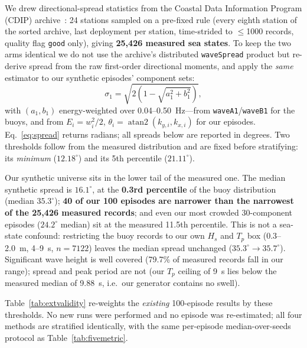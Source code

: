 We drew directional-spread statistics from the Coastal Data Information Program
(CDIP) archive~\citep{cdip, oreilly2016}: 24 stations sampled on a pre-fixed rule (every
eighth station of the sorted archive, last deployment per station, time-strided
to $\leq$1000 records, quality flag \texttt{good} only), giving
\textbf{25,426 measured sea states}.  To keep the two arms identical we do not
use the archive's distributed \texttt{waveSpread} product but re-derive spread
from the raw first-order directional moments, and apply the \emph{same}
estimator to our synthetic episodes' component sets:
\begin{equation}
  \sigma_1 = \sqrt{2\left(1 - \sqrt{a_1^2 + b_1^2}\right)},
  \label{eq:spread}
\end{equation}
with $(a_1, b_1)$ energy-weighted over 0.04--0.50~Hz---from
\texttt{waveA1}/\texttt{waveB1} for the buoys, and from
$E_i = w_i^2/2$, $\theta_i = \operatorname{atan2}(k_{y,i}, k_{x,i})$ for our
episodes.  Eq.~\eqref{eq:spread} returns radians; all spreads below are
reported in degrees.  Two thresholds follow from the measured distribution and are fixed
before stratifying: its \emph{minimum} ($12.18^\circ$) and its 5th percentile
($21.11^\circ$).

Our synthetic universe sits in the lower tail of the measured one.  The median
synthetic spread is $16.1^\circ$, at the \textbf{0.3rd percentile} of the buoy
distribution (median $35.3^\circ$); \textbf{40 of our 100 episodes are narrower
than the narrowest of the 25,426 measured records}; and even our most crowded
30-component episodes ($24.2^\circ$ median) sit at the measured 11.5th
percentile.  This is not a sea-state confound: restricting the buoy records to
our own $H_s$ and $T_p$ box (0.3--2.0~m, 4--9~s, $n=7122$) leaves the median
spread unchanged ($35.3^\circ \to 35.7^\circ$).  Significant wave height is
well covered (79.7\% of measured records fall in our range); spread and peak
period are not (our $T_p$ ceiling of 9~s lies below the measured median of
9.88~s, i.e.\ our generator contains no swell).

Table~\ref{tab:extvalidity} re-weights the \emph{existing} 100-episode results
by these thresholds.  No new runs were performed and no episode was
re-estimated; all four methods are stratified identically, with the same
per-episode median-over-seeds protocol as Table~\ref{tab:fivemetric}.

